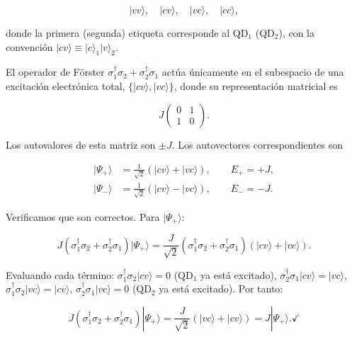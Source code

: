 \documentclass[12pt]{article}
\begin{document}
	\begin{equation}
		|vv\rangle, \quad |cv\rangle, \quad |vc\rangle, \quad |cc\rangle,
	\end{equation}
	
	donde la primera (segunda) etiqueta corresponde al QD$_1$ (QD$_2$), con la
	convenci\'on $|cv\rangle \equiv |c\rangle_1|v\rangle_2$.
	
	\medskip
	\noindent
	El operador de F\"orster $\sigma_1^\dagger\sigma_2 + \sigma_2^\dagger\sigma_1$
	act\'ua \'unicamente en el subespacio de una excitaci\'on electr\'onica total,
	$\{|cv\rangle, |vc\rangle\}$, donde su representaci\'on matricial es
	
	\begin{equation}
		J\begin{pmatrix} 0 & 1 \\ 1 & 0 \end{pmatrix}.
	\end{equation}
	
	Los autovalores de esta matriz son $\pm J$. Los autovectores correspondientes
	son
	
	\begin{align}
		|\Psi_+\rangle &= \frac{1}{\sqrt{2}}\left(|cv\rangle + |vc\rangle\right),
		\qquad E_+ = +J,
		\label{eq:Psi_plus}\\[6pt]
		|\Psi_-\rangle &= \frac{1}{\sqrt{2}}\left(|cv\rangle - |vc\rangle\right),
		\qquad E_- = -J.
		\label{eq:Psi_minus}
	\end{align}
	
	\medskip
	\noindent
	Verificamos que son correctos. Para $|\Psi_+\rangle$:
	
	\begin{equation}
		J\left(\sigma_1^\dagger\sigma_2 + \sigma_2^\dagger\sigma_1\right)|\Psi_+\rangle
		= \frac{J}{\sqrt{2}}\left(\sigma_1^\dagger\sigma_2 + \sigma_2^\dagger\sigma_1\right)
		\left(|cv\rangle + |vc\rangle\right).
	\end{equation}
	
	Evaluando cada t\'ermino:
	$\sigma_1^\dagger\sigma_2|cv\rangle = 0$ (QD$_1$ ya est\'a excitado),
	$\sigma_2^\dagger\sigma_1|cv\rangle = |vc\rangle$,
	$\sigma_1^\dagger\sigma_2|vc\rangle = |cv\rangle$,
	$\sigma_2^\dagger\sigma_1|vc\rangle = 0$ (QD$_2$ ya est\'a excitado). Por tanto:
	
	\begin{equation}
		J\left(\sigma_1^\dagger\sigma_2 + \sigma_2^\dagger\sigma_1\right)|\Psi_+\rangle
		= \frac{J}{\sqrt{2}}\left(|vc\rangle + |cv\rangle\right) = J|\Psi_+\rangle. \checkmark
	\end{equation}
	
\end{document}
